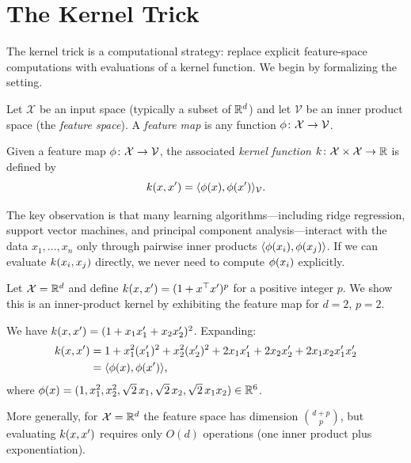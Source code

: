 \documentclass[11pt,a4paper]{article}
\begin{document}

\section{The Kernel Trick}
\label{sec:kernel-trick}

The kernel trick is a computational strategy: replace explicit
feature-space computations with evaluations of a kernel function.
We begin by formalizing the setting.

\begin{definition}
\label{def:feature-map}
Let $\mathcal{X}$ be an input space (typically a subset of $\mathbb{R}^d$)
and let $\mathcal{V}$ be an inner product space (the \emph{feature
space}). A \emph{feature map} is any function
$\phi \colon \mathcal{X} \to \mathcal{V}$.
\end{definition}

\begin{definition}
\label{def:kernel-function}
Given a feature map $\phi \colon \mathcal{X} \to \mathcal{V}$,
the associated \emph{kernel function}
$k \colon \mathcal{X} \times \mathcal{X} \to \mathbb{R}$ is defined by
\begin{equation}
\label{eq:kernel-def}
k(x, x') = \langle \phi(x), \phi(x') \rangle_{\mathcal{V}}.
\end{equation}
\end{definition}

The key observation is that many learning algorithms---including
ridge regression, support vector machines, and principal component
analysis---interact with the data $x_1, \ldots, x_n$ only through
pairwise inner products $\langle \phi(x_i), \phi(x_j)
\rangle$. If we can evaluate $k(x_i, x_j)$ directly, we
never need to compute $\phi(x_i)$ explicitly.

\begin{example}
\label{ex:polynomial-kernel}
Let $\mathcal{X} = \mathbb{R}^d$ and define $k(x, x') = (1 + x^\top
x')^p$ for a positive integer $p$. We show this is an inner-product
kernel by exhibiting the feature map for $d = 2$, $p = 2$.

We have $k(x, x') = (1 + x_1 x_1' + x_2 x_2')^2$. Expanding:
\begin{align*}
k(x, x') &= 1 + x_1^2 (x_1')^2 + x_2^2 (x_2')^2
  + 2 x_1 x_1' + 2 x_2 x_2' + 2 x_1 x_2 x_1' x_2' \\
&= \langle \phi(x), \phi(x') \rangle,
\end{align*}
where $\phi(x) = (1, x_1^2, x_2^2, \sqrt{2}\, x_1,
\sqrt{2}\, x_2, \sqrt{2}\, x_1 x_2) \in \mathbb{R}^6$.

More generally, for $\mathcal{X} = \mathbb{R}^d$ the feature space has
dimension $\binom{d+p}{p}$, but evaluating $k(x, x')$
requires only $O(d)$ operations (one inner product plus
exponentiation).
\end{example}
\end{document}
